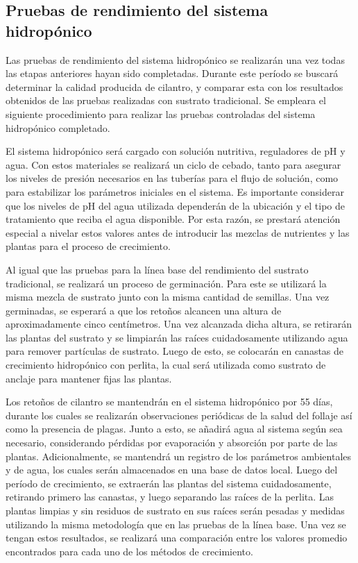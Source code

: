 \subsection*{Pruebas de rendimiento del sistema hidropónico}
Las pruebas de rendimiento del sistema hidropónico se realizarán una vez todas las etapas anteriores hayan sido completadas. Durante este período se buscará determinar la calidad producida de cilantro, y comparar esta con los resultados obtenidos de las pruebas realizadas con sustrato tradicional. Se empleara el siguiente procedimiento para realizar las pruebas controladas del sistema hidropónico completado.

El sistema hidropónico será cargado con solución nutritiva, reguladores de pH y agua. Con estos materiales se realizará un ciclo de cebado, tanto para asegurar los niveles de presión necesarios en las tuberías para el flujo de solución, como para estabilizar los parámetros iniciales en el sistema. Es importante considerar que los niveles de pH del agua utilizada dependerán de la ubicación y el tipo de tratamiento que reciba el agua disponible. Por esta razón, se prestará atención especial a nivelar estos valores antes de introducir las mezclas de nutrientes y las plantas para el proceso de crecimiento.

Al igual que las pruebas para la línea base del rendimiento del sustrato tradicional, se realizará un proceso de germinación. Para este se utilizará la misma mezcla de sustrato junto con la misma cantidad de semillas. Una vez germinadas, se esperará a que los retoños alcancen una altura de aproximadamente cinco centímetros. Una vez alcanzada dicha altura, se retirarán las plantas del sustrato y se limpiarán las raíces cuidadosamente utilizando agua para remover partículas de sustrato. Luego de esto, se colocarán en canastas de crecimiento hidropónico con perlita, la cual será utilizada como sustrato de anclaje para mantener fijas las plantas.

Los retoños de cilantro se mantendrán en el sistema hidropónico por 55 días, durante los cuales se realizarán observaciones periódicas de la salud del follaje así como la presencia de plagas. Junto a esto, se añadirá agua al sistema según sea necesario, considerando pérdidas por evaporación y absorción por parte de las plantas. Adicionalmente, se mantendrá un registro de los parámetros ambientales y de agua, los cuales serán almacenados en una base de datos local. Luego del período de crecimiento, se extraerán las plantas del sistema cuidadosamente, retirando primero las canastas, y luego separando las raíces de la perlita. Las plantas limpias y sin residuos de sustrato en sus raíces serán pesadas y medidas utilizando la misma metodología que en las pruebas de la línea base. Una vez se tengan estos resultados, se realizará una comparación entre los valores promedio encontrados para cada uno de los métodos de crecimiento. 

